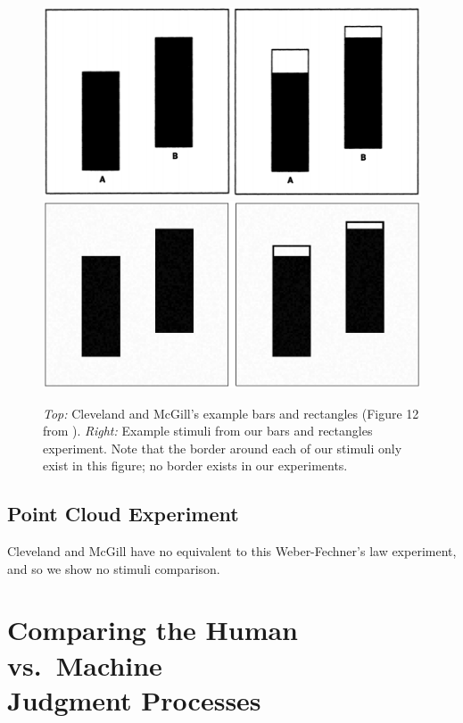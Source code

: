 \documentclass[journal]{vgtc}        %
\newcommand{\change}[1]{{#1}}
\begin{document}
\begin{figure}[tb]
    \centering
    \includegraphics[width=0.8\linewidth]{./gfx/CMcG_Comparison/CMcG_BarsRectangles.png}\\
    \includegraphics[width=0.8\linewidth]{./gfx/CMcG_Comparison/Ours_BarsRectangles.pdf}
    \caption{\emph{Top:} Cleveland and McGill's example bars and rectangles (Figure 12 from \cite{cleveland_mcgill}). \emph{Right:} Example stimuli from our bars and rectangles experiment. Note that the border around each of our stimuli only exist in this figure; no border exists in our experiments.}
    \label{fig:cmcg_barsrectangles_comparison}
\end{figure}

\subsection{Point Cloud Experiment}

\change{
Cleveland and McGill have no equivalent to this Weber-Fechner's law experiment, and so we show no stimuli comparison.
}


\section{\change{Comparing the Human vs.~Machine\\Judgment Processes}}
\end{document}

